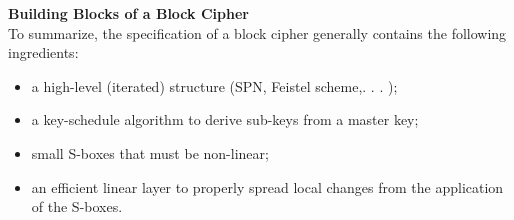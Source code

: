 \textbf{Building Blocks of a Block Cipher}\ \\
To summarize, the specification of a block cipher generally contains the following ingredients:
\begin{itemize}
    \item a high-level (iterated) structure (SPN, Feistel scheme,. . . );
    \item a key-schedule algorithm to derive sub-keys from a master key;
    \item small S-boxes that must be non-linear;
    \item an efficient linear layer to properly spread local changes from the application of the S-boxes.\newline
\end{itemize}

